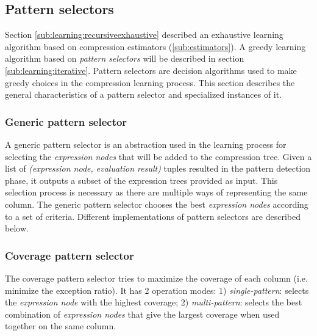 \subsection{Pattern selectors}
\label{sub:learning:selectors}


\graphicspath{{5_automatic_learning/learning_process/images/}}

% 

Section \ref{sub:learning:recursiveexhaustive} described an exhaustive learning algorithm based on compression estimators (\ref{sub:estimators}). A greedy learning algorithm based on \emph{pattern selectors} will be described in section \ref{sub:learning:iterative}. Pattern selectors are decision algorithms used to make greedy choices in the compression learning process. This section describes the general characteristics of a pattern selector and specialized instances of it.

\subsubsection{Generic pattern selector}
\label{subsubsec:ps:generic}

A generic pattern selector is an abstraction used in the learning process for selecting the \textit{expression nodes} that will be added to the compression tree. Given a list of \textit{(expression node, evaluation result)} tuples resulted in the pattern detection phase, it outputs a subset of the expression trees provided as input. This selection process is necessary as there are multiple ways of representing the same column. The generic pattern selector chooses the best \textit{expression nodes} according to a set of criteria. Different implementations of pattern selectors are described below.


\subsubsection{Coverage pattern selector}
\label{subsubsec:ps:coverage}

The coverage pattern selector tries to maximize the coverage of each column (i.e. minimize the exception ratio). It has 2 operation modes: 1) \textit{single-pattern}: selects the \textit{expression node} with the highest coverage; 2) \textit{multi-pattern}: selects the best combination of \textit{expression nodes} that give the largest coverage when used together on the same column.

